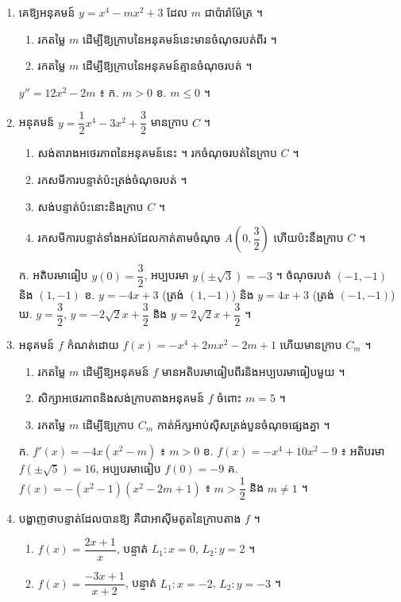 \begin{enumerate}[1]
  \item គេឱ្យអនុគមន៍ $y = x^4 - mx^2 + 3$ ដែល $m$ ជាប៉ារ៉ាម៉ែត្រ ។
  \begin{enumerate}[a]
    \item រកតម្លៃ $m$ ដើម្បីឱ្យក្រាបនៃអនុគមន៍នេះមានចំណុចរបត់ពីរ ។
    \item រកតម្លៃ $m$ ដើម្បីឱ្យក្រាបនៃអនុគមន៍គ្មានចំណុចរបត់ ។
  \end{enumerate}
  \ans
  $y'' = 12x^2 - 2m$ ៖ ក. $m > 0$ \quad ខ. $m \le 0$ ។
  \item អនុគមន៍ $y = \dfrac{1}{2}x^4 - 3x^2 + \dfrac{3}{2}$ មានក្រាប $C$ ។
  \begin{enumerate}[a]
    \item សង់តារាងអថេរភាពនៃអនុគមន៍នេះ ។ រកចំណុចរបត់នៃក្រាប $C$ ។
    \item រកសមីការបន្ទាត់ប៉ះត្រង់ចំណុចរបត់ ។
    \item សង់បន្ទាត់ប៉ះនោះនិងក្រាប $C$ ។
    \item រកសមីការបន្ទាត់ទាំងអស់ដែលកាត់តាមចំណុច $A\left(0, \dfrac{3}{2}\right)$ ហើយប៉ះនឹងក្រាប $C$ ។
  \end{enumerate}
  \ans
  ក. អតិបរមាធៀប $y(0) = \dfrac{3}{2}$, អប្បបរមា $y(\pm\sqrt{3}) = -3$ ។ ចំណុចរបត់ $(-1, -1)$ និង $(1, -1)$ \quad ខ. $y = -4x + 3$ (ត្រង់ $(1, -1)$) និង $y = 4x + 3$ (ត្រង់ $(-1, -1)$) \quad ឃ. $y = \dfrac{3}{2}$, $y = -2\sqrt{2}x + \dfrac{3}{2}$ និង $y = 2\sqrt{2}x + \dfrac{3}{2}$ ។
  \item អនុគមន៍ $f$ កំណត់ដោយ $f(x) = -x^4 + 2mx^2 - 2m + 1$ ហើយមានក្រាប $C_m$ ។
  \begin{enumerate}[a]
    \item រកតម្លៃ $m$ ដើម្បីឱ្យអនុគមន៍ $f$ មានអតិបរមាធៀបពីរនិងអប្បបរមាធៀបមួយ ។
    \item សិក្សាអថេរភាពនិងសង់ក្រាបតាងអនុគមន៍ $f$ ចំពោះ $m = 5$ ។
    \item រកតម្លៃ $m$ ដើម្បីឱ្យក្រាប $C_m$ កាត់អ័ក្សអាប់ស៊ីសត្រង់បួនចំណុចផ្សេងគ្នា ។
  \end{enumerate}
  \ans
  ក. $f'(x) = -4x(x^2 - m)$ ៖ $m > 0$ \quad ខ. $f(x) = -x^4 + 10x^2 - 9$ ៖ អតិបរមា $f(\pm\sqrt{5}) = 16$, អប្បបរមាធៀប $f(0) = -9$ \quad គ. $f(x) = -(x^2 - 1)(x^2 - 2m + 1)$ ៖ $m > \dfrac{1}{2}$ និង $m \ne 1$ ។
  \item បង្ហាញថាបន្ទាត់ដែលបានឱ្យ គឺជាអាស៊ីមតូតនៃក្រាបតាង $f$ ។
  \begin{enumerate}[a]
    \item $f(x) = \dfrac{2x + 1}{x}$, បន្ទាត់ $L_1 : x = 0$, $L_2 : y = 2$ ។
    \item $f(x) = \dfrac{-3x + 1}{x + 2}$, បន្ទាត់ $L_1 : x = -2$, $L_2 : y = -3$ ។

\end{enumerate}
\end{enumerate}
